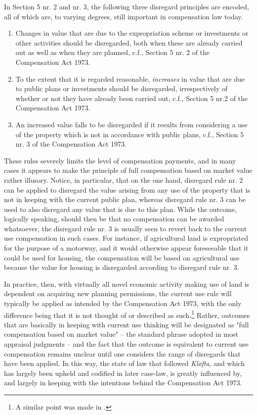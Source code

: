 In Section 5 nr. 2 and nr. 3, the following three disregard principles are encoded, all of which are, to varying degrees, still important in compensation law today.

\begin{enumerate}
\item Changes in value that are due to the expropriation scheme or investments or other activities should be disregarded, both when these are already carried out as well as when they are planned, c.f., Section 5 nr. 2 of the Compensation Act 1973.
\item To the extent that it is regarded reasonable, \emph{increases} in value that are due to public plans or investments should be disregarded, irrespectively of whether or not they have already been carried out, c.f., Section 5 nr.2 of the Compensation Act 1973.
\item An increased value falls to be disregarded if it results from considering a use of the property which is not in accordance with public plans, c.f., Section 5 nr. 3 of the Compensation Act 1973.
\end{enumerate}

These rules severely limits the level of compensation payments, and in many cases it appears to make the principle of full compensation based on market value rather illusory. Notice, in particular, that on the one hand, disregard rule nr. 2 can be applied to disregard the value arising from any use of the property that is not in keeping with the current public plan, whereas disregard rule nr. 3 can be used to also disregard any value that is due to this plan. While the outcome, logically speaking, should then be that no compensation can be awarded whatsoever, the disregard rule nr. 3 is usually seen to revert back to the current use compensation in such cases. For instance, if agricultural land is expropriated for the purpose of a motorway, and it would otherwise appear foreseeable that it could be used for housing, the compensation will be based on agricultural use because the value for housing is disregarded according to disregard rule nr. 3.

In practice, then, with virtually all novel economic activity making use of land is dependent on acquiring new planning permissions, the current use rule will typically be applied as intended by the Compensation Act 1973, with the only difference being that it is not thought of or described as such.\footnote{A similar point was made in \cite{stor}.} Rather, outcomes that are basically in keeping with current use thinking will be designated as "full compensation based on market value" -- the standard phrase adopted in most appraisal judgments -- and the fact that the outcome is equivalent to current use compensation remains unclear until one considers the range of disregards that have been applied. In this way, the state of law that followed \emph{Kløfta}, and which has largely been upheld and codified in later case-law, is greatly influenced by, and largely in keeping with the intentions behind the Compensation Act 1973. 

